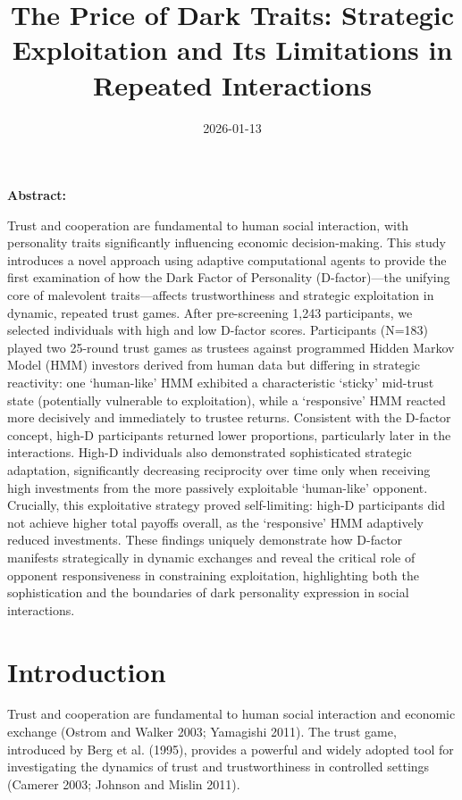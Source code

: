 \documentclass[
]{article}
\title{The Price of Dark Traits: Strategic Exploitation and Its Limitations in Repeated Interactions}
\author{}
\date{\vspace{-2.5em}2026-01-13}
\begin{document}
\maketitle

\textbf{Abstract:}

Trust and cooperation are fundamental to human social interaction, with personality traits significantly influencing economic decision-making.
This study introduces a novel approach using adaptive computational agents to provide the first examination of how the Dark Factor of Personality (D-factor)---the unifying core of malevolent traits---affects trustworthiness and strategic exploitation in dynamic, repeated trust games.
After pre-screening 1,243 participants, we selected individuals with high and low D-factor scores.
Participants (N=183) played two 25-round trust games as trustees against programmed Hidden Markov Model (HMM) investors derived from human data but differing in strategic reactivity: one `human-like' HMM exhibited a characteristic `sticky' mid-trust state (potentially vulnerable to exploitation), while a `responsive' HMM reacted more decisively and immediately to trustee returns.
Consistent with the D-factor concept, high-D participants returned lower proportions, particularly later in the interactions.
High-D individuals also demonstrated sophisticated strategic adaptation, significantly decreasing reciprocity over time only when receiving high investments from the more passively exploitable `human-like' opponent.
Crucially, this exploitative strategy proved self-limiting: high-D participants did not achieve higher total payoffs overall, as the `responsive' HMM adaptively reduced investments.
These findings uniquely demonstrate how D-factor manifests strategically in dynamic exchanges and reveal the critical role of opponent responsiveness in constraining exploitation, highlighting both the sophistication and the boundaries of dark personality expression in social interactions.

\pagebreak

\section{Introduction}\label{introduction}

Trust and cooperation are fundamental to human social interaction and economic exchange (Ostrom and Walker 2003; Yamagishi 2011).
The trust game, introduced by Berg et al. (1995), provides a powerful and widely adopted tool for investigating the dynamics of trust and trustworthiness in controlled settings (Camerer 2003; Johnson and Mislin 2011).
\end{document}
